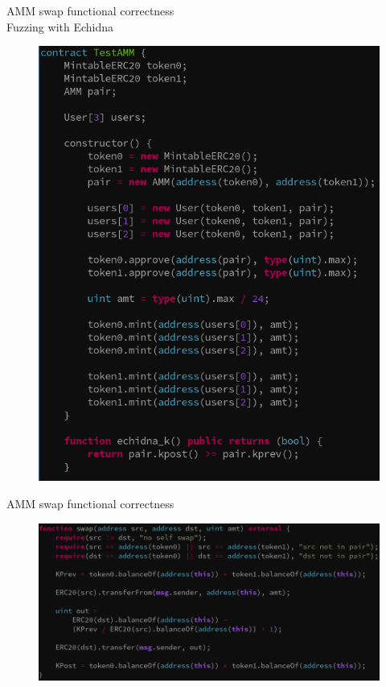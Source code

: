 \documentclass[aspectratio=169,10pt]{beamer}
\begin{document}
\begin{frame}[fragile]
\begin{center}
AMM swap functional correctness\\
Fuzzing with Echidna
\begin{figure}
\includegraphics[scale=0.2]{images/amm_fail_echidna_code_test}
\end{figure}
\end{center}
\end{frame}

\begin{frame}[fragile]
\begin{center}
AMM swap functional correctness
\begin{figure}
	\includegraphics[scale=0.35]{images/amm_pass}
\end{figure}
\end{center}
\end{frame}
\end{document}
